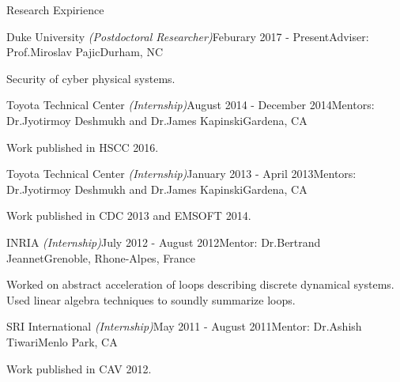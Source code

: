 \begin{rSection}{Research Expirience}

\begin{rSubsection}{Duke University \emph{(Postdoctoral Researcher)}}{Feburary 2017 - Present}{Adviser: Prof.Miroslav Pajic}{Durham, NC}
\item[]
\vspace{-0.1cm}
Security of cyber physical systems.
\end{rSubsection}

\begin{rSubsection}{Toyota Technical Center \emph{(Internship)}}{August 2014 - December 2014}{Mentors: Dr.Jyotirmoy Deshmukh and Dr.James Kapinski}{Gardena, CA}
\item[]
\vspace{-0.1cm}
Work published in HSCC 2016.
\end{rSubsection}

\begin{rSubsection}{Toyota Technical Center \emph{(Internship)}}{January 2013 - April 2013}{Mentors: Dr.Jyotirmoy Deshmukh and Dr.James Kapinski}{Gardena, CA}
\item[]
\vspace{-0.1cm}
Work published in CDC 2013 and EMSOFT 2014.
\end{rSubsection}

\begin{rSubsection}{INRIA \emph{(Internship)}}{July 2012 - August 2012}{Mentor: Dr.Bertrand Jeannet}{Grenoble, Rhone-Alpes, France}
\item[]
\vspace{-0.1cm}
	Worked on abstract acceleration of loops describing discrete dynamical systems.\\
    Used linear algebra techniques to soundly summarize loops.
\end{rSubsection}

\begin{rSubsection}{SRI International \emph{(Internship)}}{May 2011 - August 2011}{Mentor: Dr.Ashish Tiwari}{Menlo Park, CA}
\item[]
\vspace{-0.1cm}
Work published in CAV 2012.
\end{rSubsection}
\end{rSection}

